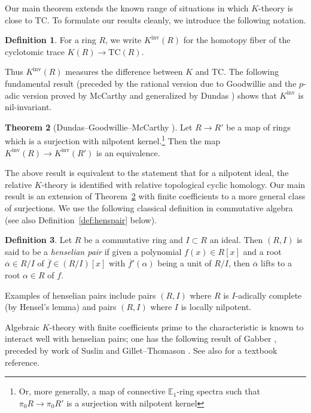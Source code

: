 \documentclass{amsart}
\newcommand{\knf}{K^{\mathrm{inv}}}
\theoremstyle{definition}
\newtheorem{definition}{Definition}[section]
\newtheorem{theorem}[definition]{Theorem}
\newcommand{\bb}{\mathbb}
\newcommand{\TC}{\mathrm{TC}}
\begin{document}
Our main theorem extends the known range of situations in which $K$-theory is
close to TC. To formulate our results cleanly, we introduce the following
notation. 

\begin{definition} 
For a ring $R$, we write  $\knf(R)$ for the  homotopy fiber of the cyclotomic trace $K(R) \to \TC(R)$. 
\end{definition} 


Thus $\knf(R)$ measures the difference between $K$ and $\TC$.  The following fundamental result 
(preceded by the rational version due to Goodwillie \cite{Goodrel} and the $p$-adic version
proved by McCarthy \cite{mccarthy} and generalized by Dundas \cite{dundas}) shows that 
$\knf$ is nil-invariant.


\begin{theorem}[Dundas--Goodwillie--McCarthy \cite{dgm}]
\label{DGMthm}
Let $R \to R'$ be a map of rings which is a surjection with nilpotent
kernel.\footnote{Or, more generally, a map of connective $\bb{E}_1$-ring spectra such that $\pi_0R\rightarrow\pi_0R'$ is a surjection with  nilpotent kernel} Then the map $\knf(R) \to \knf(R')$ is an equivalence. \end{theorem}


The above result is equivalent to the statement that for a nilpotent ideal, the
relative $K$-theory is identified with relative topological cyclic homology. 
Our main result is an extension  of Theorem~\ref{DGMthm} with finite coefficients to a more
general class of surjections. 
We use the following classical definition in commutative algebra (see also
Definition~\ref{def:henspair} below). 
\begin{definition} 
Let $R$ be a commutative ring and $I \subset R$ an ideal. Then $(R, I)$ is said
to be a \emph{henselian pair} if given a polynomial
$f(x) \in R[x]$ and a root $\overline{\alpha} \in R/I$ of $\overline{f} \in (R/I)[x]$ with
$\overline{f}'(\alpha)$ being a unit of $R/I$, then $\overline \alpha$ lifts to a root $\alpha \in R$ of $f$.

Examples of henselian pairs include pairs $(R, I)$ where $R$ is $I$-adically
complete (by Hensel's lemma) and pairs $(R, I)$ where $I$ is locally nilpotent. 
\end{definition} 

Algebraic $K$-theory with finite coefficients prime to the characteristic 
is known to interact well with henselian pairs; one has the following result of Gabber
\cite{gabber}, preceded by work of Suslin \cite{Suslinlocal} and  Gillet--Thomason \cite{GT}. 
See also \cite[Sec.~4.6]{Arf} for a textbook reference. 
\end{document}
